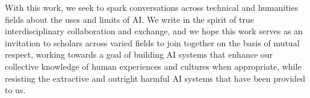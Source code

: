 With this work, we seek to spark conversations across technical and humanities fields about the uses and limits of AI. We write in the spirit of true interdisciplinary collaboration and exchange, and we hope this work serves as an invitation to scholars across varied fields to join together on the basis of mutual respect, working towards a goal of building AI systems that enhance our collective knowledge of human experiences and cultures when appropriate, while resisting the extractive and outright harmful AI systems that have been provided to us.  
